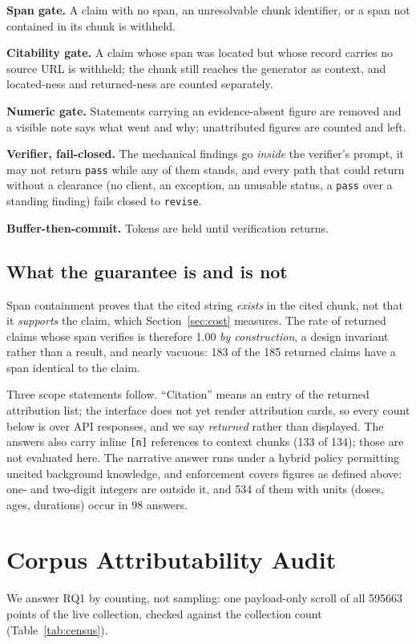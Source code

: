 \documentclass[conference,a4paper]{IEEEtran}
\begin{document}
\textbf{Span gate.} A claim with no span, an unresolvable chunk identifier, or a span not
contained in its chunk is withheld.

\textbf{Citability gate.} A claim whose span was located but whose record carries no source
URL is withheld; the chunk still reaches the generator as context, and located-ness and
returned-ness are counted separately.

\textbf{Numeric gate.} Statements carrying an evidence-absent figure are removed and a visible note
says what went and why; unattributed figures are counted and left.

\textbf{Verifier, fail-closed.} The mechanical findings go \emph{inside} the verifier's
prompt, it may not return \texttt{pass} while any of them stands, and every path that could
return without a clearance (no client, an exception, an unusable status, a \texttt{pass} over
a standing finding) fails closed to \texttt{revise}.

\textbf{Buffer-then-commit.} Tokens are held until verification returns.

\subsection{What the guarantee is and is not}
Span containment proves that the cited string \emph{exists} in the cited chunk, not that it
\emph{supports} the claim, which Section~\ref{sec:cost} measures. The rate of returned claims
whose span verifies is therefore 1.00 \emph{by construction}, a design invariant rather than a
result, and nearly vacuous: \num{183} of the \num{185} returned claims have a span identical
to the claim.

Three scope statements follow. ``Citation'' means an entry of the returned attribution list;
the interface does not yet render attribution cards, so every count below is over API
responses, and we say \emph{returned} rather than displayed. The answers also carry inline
\texttt{[n]} references to context chunks (133 of 134); those are not evaluated here. The
narrative answer runs under a hybrid policy permitting uncited background knowledge, and
enforcement covers figures as defined above: one- and two-digit integers are outside it, and
\num{534} of them with units (doses, ages, durations) occur in 98 answers.
\section{Corpus Attributability Audit}\label{sec:audit}
We answer RQ1 by counting, not sampling: one payload-only scroll of all \num{595663} points of
the live collection, checked against the collection count (Table~\ref{tab:census}).
\end{document}
